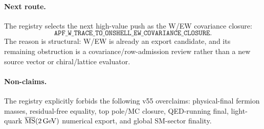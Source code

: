 \paragraph{Next route.}
The registry selects the next high-value push as the W/EW covariance closure:
\[
\boxed{\texttt{APF\_W\_TRACE\_TO\_ONSHELL\_EW\_COVARIANCE\_CLOSURE}}.
\]
The reason is structural: W/EW is already an export candidate, and its remaining
obstruction is a covariance/row-admission review rather than a new source vector
or chiral/lattice evaluator.

\paragraph{Non-claims.}
The registry explicitly forbids the following v55 overclaims: physical-final
fermion masses, residual-free equality, top pole/MC closure, QED-running final,
light-quark \(\overline{\rm MS}(2\,{\rm GeV})\) numerical export, and global
SM-sector finality.


